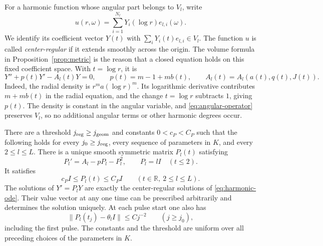For a harmonic function whose angular part belongs to \(V_l\), write
\[
 u(r,\omega)=\sum_{i=1}^{N_l}Y_i(\log r)e_{l,i}(\omega).
\]
We identify its coefficient vector \(Y(t)\) with
\(\sum_iY_i(t)e_{l,i}\in V_l\).
The function \(u\) is called \emph{center-regular} if it extends smoothly across
the origin.  The volume formula in Proposition~\ref{prop:metric} is the
reason that a closed equation holds on this fixed coefficient
space.  With \(t=\log r\), it is
\begin{equation}
 Y''+p(t)Y'-A_l(t)Y=0,\qquad
 p(t)=m-1+mb(t),\qquad
 A_l(t)=A_l(a(t),q(t),J(t)).
 \label{eq:harmonic-ode}
\end{equation}
Indeed, the radial density is \(r^m a(\log r)^m\).  Its logarithmic
derivative contributes \(m+mb(t)\) in the radial equation, and the
change \(t=\log r\) subtracts \(1\), giving \(p(t)\).
The density is constant in the angular variable, and
\eqref{eq:angular-operator} preserves \(V_l\), so no additional
angular terms or other harmonic degrees occur.

\begin{lemma}
\label{lem:regular}
There are a threshold \(j_{\rm reg}\geq j_{\rm geom}\) and constants
\(0<c_P<C_P\) such that the following holds for every
\(j_0\geq j_{\rm reg}\), every sequence of parameters in \(K\),
and every \(2\leq l\leq L\).  There is a unique smooth symmetric
matrix \(P_l(t)\) satisfying
\begin{equation}
 P_l'=A_l-pP_l-P_l^2,\qquad P_l=lI\quad(t\leq2).
 \label{eq:riccati}
\end{equation}
It satisfies
\begin{equation}
 c_PI\leq P_l(t)\leq C_PI
 \qquad(t\in\mathbb R,\ 2\leq l\leq L).
 \label{eq:riccati-barriers}
\end{equation}
The solutions of \(Y'=P_lY\) are exactly the center-regular
solutions of \eqref{eq:harmonic-ode}.  Their value vector at
any one time can be prescribed arbitrarily and determines the
solution uniquely.  At each pulse start one also has
\begin{equation}
 \|P_l(t_j)-\theta_l I\|\leq Cj^{-2}
 \qquad(j\geq j_0),
 \label{eq:round-reset}
\end{equation}
including the first pulse.  The constants and the threshold are
uniform over all preceding choices of the parameters in \(K\).
\end{lemma}

